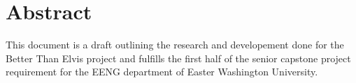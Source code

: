\section{Abstract}
	This document is a draft outlining the research and developement done for the Better Than Elvis project and fulfills the first half of the senior capstone project requirement for the EENG department of Easter Washington University. 
